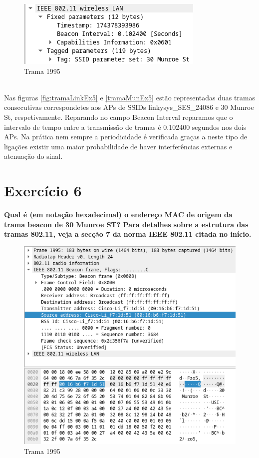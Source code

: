 \documentclass[a4paper]{report}
\begin{document}
\begin{figure}[H]
    \centering 
    \includegraphics[width=\textwidth]{images/tramaMunEx5.png}  
    \caption{Trama 1995}
    \label{fig:tramaMunEx5}
\end{figure}\\

Nas figuras \ref{fig:tramaLinkEx5} e \ref{tramaMunEx5} estão representadas duas
tramas consecutivas correspondetes aos APs de SSIDs linkysys\_SES\_24086 e 30
Munroe St, respetivamente. Reparando no campo Beacon Interval reparamos que o
intervalo de tempo entre a transmissão de tramas é 0.102400 segundos nos dois APs.
Na prática nem sempre a periodicidade é verificada graças a neste tipo de
ligações existir uma maior probabilidade de haver interferências externas e
atenuação do sinal.

\section{Exercício 6}
\textbf{Qual é (em notação hexadecimal) o endereço MAC de origem da trama beacon
    de 30 Munroe ST? Para detalhes sobre a estrutura das tramas 802.11, veja a
    secção 7 da norma IEEE 802.11 citada no início.}\\

\begin{figure}[H]
    \centering 
    \includegraphics[width=\textwidth]{images/tramaEx6.png}  
    \caption{Trama 1995}
    \label{fig:tramaEx6}
\end{figure}\\
\end{document}
